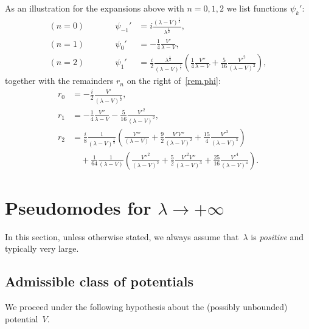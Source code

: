 As an illustration for the expansions above with $n=0,1,2$ 
we list functions $\psi_k'$: 
\begin{equation}\label{psi'.list}
\begin{aligned}
(n=0) &\qquad&
\psi_{-1}' &= i \frac{(\lambda - V)^\frac12}{\lambda^\frac 12}, 
\\
(n=1) &&
\psi_0' & = -\frac14 \frac{V'}{\lambda - V}, 
\\
(n=2) &&
\psi_1' &= \frac{i}{2} 
\frac{\lambda^\frac 12}{(\lambda - V)^\frac12} 
\left( \frac14 \frac{V''}{\lambda-V} 
+ \frac{5}{16} \frac{V'^2}{(\lambda-V)^2}  \right),
\end{aligned}
\end{equation}
together with 
the remainders $r_n$ on the right of~\eqref{rem.phi}: 
\begin{equation}\label{rn.est.list}
\begin{aligned}
r_0 & = -\frac{i}{2} \frac{V'}{(\lambda-V)^\frac12},
\\
r_1 & = -\frac{1}{4} \frac{V''}{\lambda-V} 
- \frac{5}{16} \frac{V'^2}{(\lambda-V)^2},
\\
r_2 & = \frac{i}{8} \frac 1{(\lambda-V)^\frac12}  
\left( \frac{V'''}{(\lambda-V)} 
+ \frac{9}{2} \frac{V'V''}{(\lambda-V)^2} 
+ \frac{15}{4} \frac{V'^3}{(\lambda-V)^3}\right) 
\\ & \quad + \frac{1}{64} \frac 1{(\lambda-V)}  \left( 
\frac{V''^2}{(\lambda-V)^2} 
+ \frac{5}{2} \frac{V'^2 V''}{(\lambda-V)^3} 
+ \frac{25}{16} \frac{V'^4}{(\lambda-V)^4}
\right).
\end{aligned}
\end{equation}

\section{Pseudomodes for $\lambda \to + \infty$}
\label{sec:pseudo.real}

In this section, unless otherwise stated,
we always assume that~$\lambda$ is \emph{positive}
and typically very large.

\subsection{Admissible class of potentials}
We proceed under the following hypothesis about the (possibly unbounded) potential~$V$.

